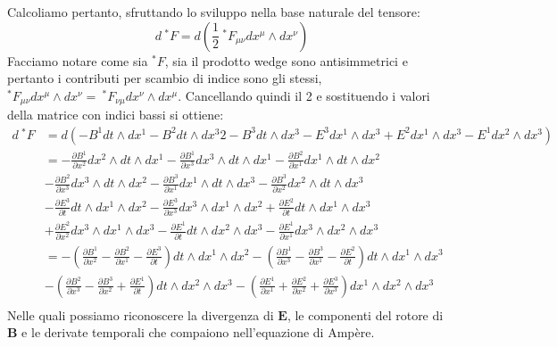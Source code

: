 Calcoliamo pertanto, sfruttando lo sviluppo nella base naturale del tensore:
\begin{equation*}
    d \ ^*F = d( \frac{1}{2} \ ^*F_{\mu\nu} dx^\mu \wedge dx^\nu)
\end{equation*}
Facciamo notare come sia $^*F$, sia il prodotto wedge sono antisimmetrici e pertanto i contributi per scambio di indice sono gli stessi, $^*F_{\mu\nu}dx^\mu \wedge dx^\nu = \ ^*F_{\nu\mu}dx^\nu \wedge dx^\mu$. Cancellando quindi il 2 e sostituendo i valori della matrice con indici bassi si ottiene:
\begin{align*}
    d \ ^*F &= d(-B^1 dt\wedge dx^1 - B^2 dt\wedge dx^3
    2 - B^3 dt\wedge dx^3 -E^3 dx^1 \wedge dx^3 + E^2 dx^1 \wedge dx^3 - E^1 dx^2 \wedge dx^3) \\
    &=  - \frac{\partial B^1}{\partial x^2} dx^2 \wedge dt \wedge dx^1
        - \frac{\partial B^1}{\partial x^3} dx^3 \wedge dt \wedge dx^1
        - \frac{\partial B^2}{\partial x^1} dx^1 \wedge dt \wedge dx^2 \\
    &   - \frac{\partial B^2}{\partial x^3} dx^3 \wedge dt \wedge dx^2
        - \frac{\partial B^3}{\partial x^1} dx^1 \wedge dt \wedge dx^3
        - \frac{\partial B^3}{\partial x^2} dx^2 \wedge dt \wedge dx^3 \\
    &   - \frac{\partial E^3}{\partial t} dt \wedge dx^1 \wedge dx^2
        - \frac{\partial E^3}{\partial x^3} dx^3 \wedge dx^1 \wedge dx^2
        + \frac{\partial E^2}{\partial t} dt \wedge dx^1 \wedge dx^3 \\
    &   + \frac{\partial E^2}{\partial x^2} dx^3 \wedge dx^1 \wedge dx^3
        - \frac{\partial E^1}{\partial t} dt \wedge dx^2 \wedge dx^3
        - \frac{\partial E^1}{\partial x^1} dx^3 \wedge dx^2 \wedge dx^3 \\
    &=  - \left(\frac{\partial B^1}{\partial x^2} - \frac{\partial B^2}{\partial x^1} -\frac{\partial E^3}{\partial t} \right)dt \wedge dx^1 \wedge dx^2
        - \left(\frac{\partial B^1}{\partial x^3} - \frac{\partial B^3}{\partial x^1} -\frac{\partial E^2}{\partial t} \right)dt \wedge dx^1 \wedge dx^3 \\
    &   - \left(\frac{\partial B^2}{\partial x^3} - \frac{\partial B^3}{\partial x^2} + \frac{\partial E^1}{\partial t} \right)dt \wedge dx^2 \wedge dx^3
        - \left( \frac{\partial E^1}{\partial x^1}  + \frac{\partial E^2}{\partial x^2} + \frac{\partial E^3}{\partial x^3}\right)dx^1 \wedge dx^2 \wedge dx^3 \\
\end{align*}
Nelle quali possiamo riconoscere la divergenza di $\bm{E}$, le componenti del rotore di $\bm{B}$ e le derivate temporali che compaiono nell'equazione di Ampère.

